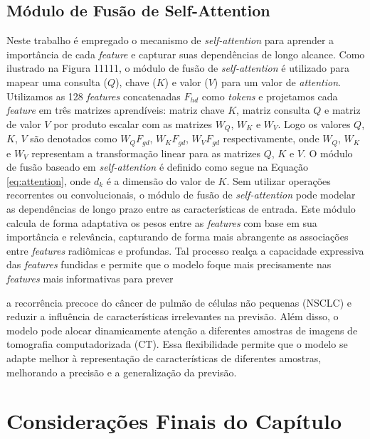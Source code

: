 \subsection{Módulo de Fusão de Self-Attention}
\label{subsec:cap4_mod_self_attention}

Neste trabalho é empregado o mecanismo de \textit{self-attention} para aprender a importância de cada \textit{feature} e capturar suas dependências de longo alcance. Como ilustrado na Figura 11111, o módulo de fusão de \textit{self-attention} é utilizado para mapear uma consulta ($Q$), chave ($K$) e valor ($V$) para um valor de \textit{attention}. Utilizamos as 128 \textit{features} concatenadas $F_{hd}$  como \textit{tokens} e projetamos cada \textit{feature} em três matrizes aprendíveis: matriz chave $K$, matriz consulta $Q$ e matriz de valor $V$ por produto escalar com as matrizes $W_{Q}$, $W_{K}$ e $W_{V}$. Logo os valores $Q$, $K$, $V$ são denotados como $W_{Q}F_{gd}$, $W_{K}F_{gd}$, $W_{V}F_{gd}$ respectivamente, onde $W_{Q}$, $W_{K}$ e $W_{V}$ representam a transformação linear para as matrizes $Q$, $K$ e $V$. O módulo de fusão baseado em \textit{self-attention} é definido como segue na Equação \ref{eq:attention}, onde $d_{k}$ é a dimensão do valor de $K$. Sem utilizar operações recorrentes ou convolucionais, o módulo de fusão de \textit{self-attention} pode modelar as dependências de longo prazo entre as características de entrada.      Este módulo calcula de forma adaptativa os pesos entre as \textit{features} com base em sua importância e relevância, capturando de forma mais abrangente as associações entre \textit{features} radiômicas e profundas. Tal processo realça a capacidade expressiva das \textit{features} fundidas e permite que o modelo foque mais precisamente nas \textit{features} mais informativas para prever 


a recorrência precoce do câncer de pulmão de células não pequenas (NSCLC) e reduzir a influência de características irrelevantes na previsão. Além disso, o modelo pode alocar dinamicamente atenção a diferentes amostras de imagens de tomografia computadorizada (CT). Essa flexibilidade permite que o modelo se adapte melhor à representação de características de diferentes amostras, melhorando a precisão e a generalização da previsão.




\section{Considerações Finais do Capítulo}
\label{sec:cap4_consideracoes_finais}

\lipsum[1-4]